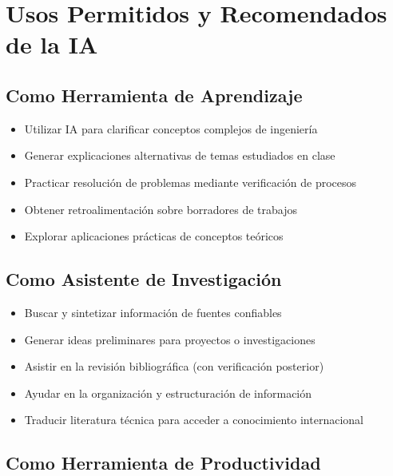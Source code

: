 \documentclass[11pt, letterpaper]{article}
\begin{document}
	\section{Usos Permitidos y Recomendados de la IA}
	
	\subsection{Como Herramienta de Aprendizaje}
	
	\begin{recomendadocaja}
		\begin{itemize}
			\item Utilizar IA para clarificar conceptos complejos de ingeniería
			\item Generar explicaciones alternativas de temas estudiados en clase
			\item Practicar resolución de problemas mediante verificación de procesos
			\item Obtener retroalimentación sobre borradores de trabajos
			\item Explorar aplicaciones prácticas de conceptos teóricos
		\end{itemize}
	\end{recomendadocaja}
	
	\subsection{Como Asistente de Investigación}
	
	\begin{recomendadocaja}
		\begin{itemize}
			\item Buscar y sintetizar información de fuentes confiables
			\item Generar ideas preliminares para proyectos o investigaciones
			\item Asistir en la revisión bibliográfica (con verificación posterior)
			\item Ayudar en la organización y estructuración de información
			\item Traducir literatura técnica para acceder a conocimiento internacional
		\end{itemize}
	\end{recomendadocaja}
	
	\subsection{Como Herramienta de Productividad}
	
\end{document}
